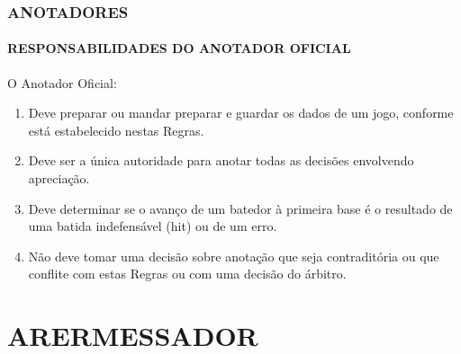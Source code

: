 \subsection{ANOTADORES}
\begin{multicols}{2}
	\subsubsection{RESPONSABILIDADES DO ANOTADOR OFICIAL }
	O Anotador Oficial: 
	
	\begin{enumerate}[label=\alph*)]
		\item Deve preparar ou mandar preparar e guardar os dados de um jogo, conforme est\'a estabelecido nestas Regras. 
		
		\item  Deve ser a \'unica autoridade para anotar todas as decis\~oes envolvendo aprecia\c{c}\~ao. 
		\item  Deve determinar se o avan\c{c}o de um batedor \`a primeira base \'e o resultado de uma batida indefens\'avel (hit) ou de um erro. 
		\item  N\~ao deve tomar uma decis\~ao sobre anota\c{c}\~ao que seja contradit\'oria ou que conflite com estas Regras ou com uma decis\~ao do \'arbitro. 
	\end{enumerate}
	
\end{multicols}

\chapter{ARERMESSADOR}
	
